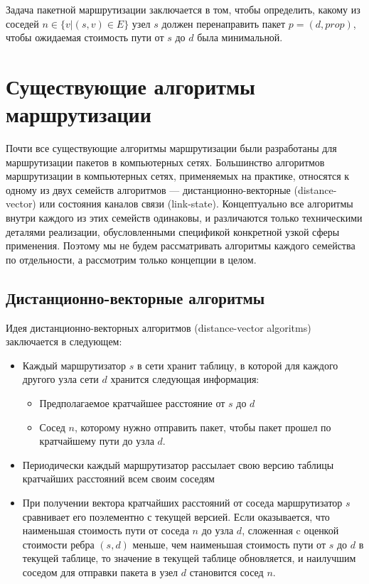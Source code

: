 \documentclass[specification, annotation]{itmo-student-thesis}
\begin{document}
Задача пакетной маршрутизации заключается в том, чтобы определить, какому из
соседей $n \in \{v | (s, v) \in E\}$ узел $s$ должен перенаправить пакет
$p = (d, prop)$, чтобы ожидаемая стоимость пути от $s$ до $d$ была минимальной.

\section{Существующие алгоритмы маршрутизации}

Почти все существующие алгоритмы маршрутизации были разработаны для
маршрутизации пакетов в компьютерных сетях. Большинство алгоритмов маршрутизации
в компьютерных сетях, применяемых на практике, относятся к одному из двух
семейств алгоритмов --- дистанционно-векторные (distance-vector)\cite{arpanet-orig} или
состояния каналов связи (link-state)\cite{link-state-arpanet}.
Концептуально все алгоритмы внутри каждого из этих семейств одинаковы, и различаются только
техническими деталями реализации, обусловленными спецификой конкретной узкой
сферы применения. Поэтому мы не будем рассматривать алгоритмы каждого семейства
по отдельности, а рассмотрим только концепции в целом.

\subsection{Дистанционно-векторные алгоритмы}

Идея дистанционно-векторных алгоритмов (distance-vector algoritms) заключается в
следующем:

\begin{itemize}
\item Каждый маршрутизатор $s$ в сети хранит таблицу, в которой для каждого другого узла
  сети $d$ хранится следующая информация:
  \begin{itemize}
  \item Предполагаемое кратчайшее расстояние от $s$ до $d$
  \item Сосед $n$, которому нужно отправить пакет, чтобы пакет прошел по
    кратчайшему пути до узла $d$.
  \end{itemize}
\item Периодически каждый маршрутизатор рассылает свою версию таблицы кратчайших
  расстояний всем своим соседям
\item При получении вектора кратчайших расстояний от соседа маршрутизатор $s$
  сравнивает его поэлементно с текущей версией. Если оказывается, что наименьшая
  стоимость пути от соседа $n$ до узла $d$, сложенная c оценкой стоимости ребра
  $(s, d)$ меньше, чем наименьшая стоимость пути от $s$ до $d$ в текущей
  таблице, то значение в текущей таблице обновляется, и наилучшим соседом для
  отправки пакета в узел $d$ становится сосед $n$.
\end{itemize}
\end{document}
